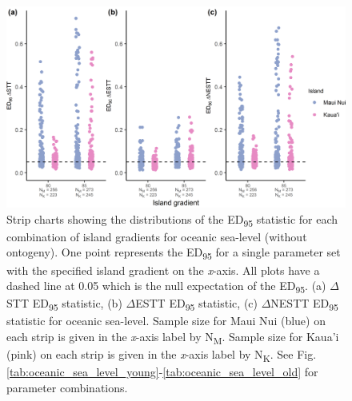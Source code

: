 \begin{figure}
    \centering
    \includegraphics{oceanic_sea_level_gradient_nltt.png}
    \caption{Strip charts showing the distributions of the ED\textsubscript{95} statistic for each combination of island gradients for oceanic sea-level (without ontogeny). One point represents the ED\textsubscript{95} for a single parameter set with the specified island gradient on the \textit{x}-axis. All plots have a dashed line at 0.05 which is the null expectation of the ED\textsubscript{95}. (a) $\Delta$STT ED\textsubscript{95} statistic, (b) $\Delta$ESTT ED\textsubscript{95} statistic, (c) $\Delta$NESTT ED\textsubscript{95} statistic for oceanic sea-level. Sample size for Maui Nui (blue) on each strip is given in the \textit{x}-axis label by N\textsubscript{M}. Sample size for Kaua'i (pink) on each strip is given in the \textit{x}-axis label by N\textsubscript{K}. See Fig. \ref{tab:oceanic_sea_level_young}-\ref{tab:oceanic_sea_level_old} for parameter combinations.}
    \label{fig:oceanic_sea_level_gradient_nltt}
\end{figure}

